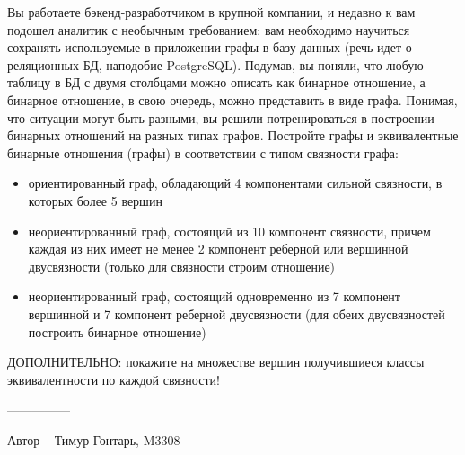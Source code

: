 \question
Вы работаете бэкенд-разработчиком в крупной компании, и недавно к вам подошел аналитик с необычным требованием: вам необходимо научиться сохранять используемые в приложении графы в базу данных (речь идет о реляционных БД, наподобие PostgreSQL). Подумав, вы поняли, что любую таблицу в БД с двумя столбцами можно описать как бинарное отношение, а бинарное отношение, в свою очередь, можно представить в виде графа. Понимая, что ситуации могут быть разными, вы решили потренироваться в построении бинарных отношений на разных типах графов. Постройте графы и эквивалентные бинарные отношения (графы) в соответствии с типом связности графа:

\begin{itemize}
\item ориентированный граф, обладающий 4 компонентами сильной связности, в которых более 5 вершин
\item неориентированный граф, состоящий из 10 компонент связности, причем каждая из них имеет не менее 2 компонент реберной или вершинной двусвязности (только для связности строим отношение)
\item неориентированный граф, состоящий одновременно из 7 компонент вершинной и 7 компонент реберной двусвязности (для обеих двусвязностей построить бинарное отношение)
\end{itemize}
ДОПОЛНИТЕЛЬНО: покажите на множестве вершин получившиеся классы эквивалентности по каждой связности!

---------------

Автор -- Тимур Гонтарь, M3308
